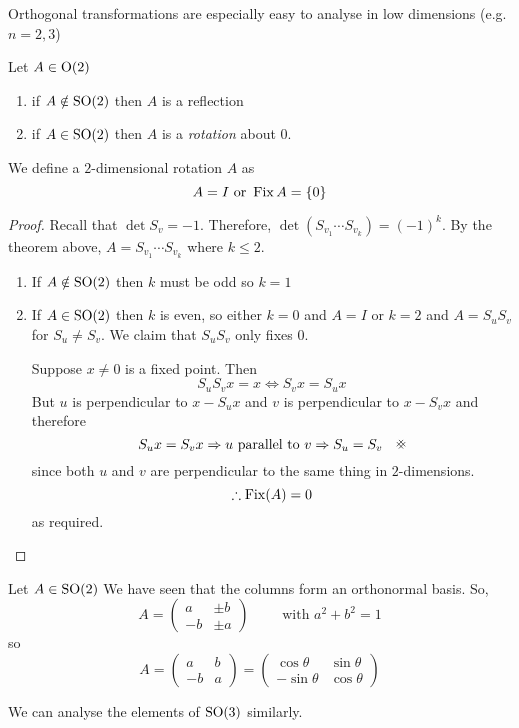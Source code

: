 \documentclass{article}
\begin{document}
Orthogonal transformations are especially easy to analyse in low dimensions (e.g. $n = 2, 3$)
\begin{lemma}[Elements of $\Or(2)$]
    Let $A \in \mathrm{O}(2)$
    \begin{enumerate}
        \item if $A \notin \mathrm{SO}(2)$ then $A$ is a reflection
        \item if $A \in \mathrm{SO}(2)$ then $A$ is a \emph{rotation} about 0.
    \end{enumerate}
\end{lemma}
\begin{defi}
    We define a $2$-dimensional rotation $A$ as
    \[
        A = I \text{ or } \operatorname{Fix}{A} = \{ 0 \}
    \]
\end{defi}
\begin{proof}
    Recall that $\det S_v = -1$. Therefore, $\det(S_{v_1}\cdots S_{v_k}) = (-1)^k$.
    By the theorem above, $A = S_{v_1}\cdots S_{v_k}$ where $k \leq 2$.
    \begin{enumerate}
        \item If $A \notin \mathrm{SO}(2)$ then $k$ must be odd so $k = 1$
        \item If $A \in \mathrm{SO}(2)$ then $k$ is even, so either $k = 0$ and $A = I$ or $k = 2$ and $A = S_uS_v$
        for $S_u \neq S_v$. We claim that $S_uS_v$ only fixes $0$.

        Suppose $x \neq 0$ is a fixed point. Then
        \[
            S_uS_v x = x\Longleftrightarrow S_v x = S_u x
        \]
        But $u$ is perpendicular to $x - S_u x$ and $v$ is perpendicular to $x - S_v x$ and therefore
        \[
            S_u x = S_v x \Rightarrow u \text{ parallel to } v \Rightarrow S_u = S_v \quad \contradiction
        \]
        since both $u$ and $v$ are perpendicular to the same thing in $2$-dimensions. 
        \[
            \therefore \operatorname{Fix}(A) = 0    
        \]
        as required.
    \end{enumerate}
\end{proof}
\begin{remark}
    Let $A \in \mathrm{SO}(2)$ We have seen that the columns form an orthonormal basis. So,
    \[
        A = \begin{pmatrix}
            a & \pm b \\
            -b & \pm a
        \end{pmatrix} \qquad \text{ with } a^2 + b^2 =  1
    \]
    so
    \[
        A = \begin{pmatrix}
            a & b \\
            -b & a
        \end{pmatrix} = \begin{pmatrix}
            \cos \theta & \sin \theta \\
            -\sin \theta & \cos \theta
        \end{pmatrix}
    \]
\end{remark}
We can analyse the elements of $\mathrm{SO}(3)$ similarly.
\end{document}
